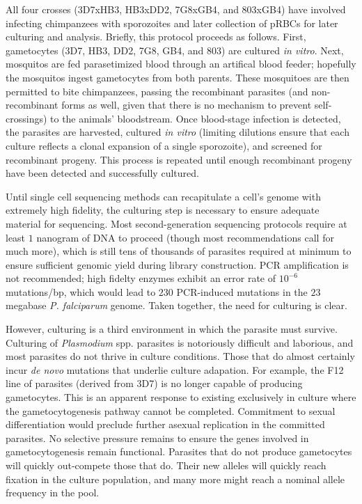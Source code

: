 All four crosses (3D7xHB3, HB3xDD2, 7G8xGB4, and 803xGB4) have involved infecting chimpanzees with sporozoites and later collection of pRBCs for later culturing and analysis\cite{RanfordCartwright:2012kp}.  Briefly, this protocol proceeds as follows.  First, gametocytes (3D7, HB3, DD2, 7G8, GB4, and 803) are cultured \textit{in vitro}.  Next, mosquitos are fed parasetimized blood through an artifical blood feeder\cite{Su:2007ipa}; hopefully the mosquitos ingest gametocytes from both parents.  These mosquitoes are then permitted to bite chimpanzees, passing the recombinant parasites (and non-recombinant forms as well, given that there is no mechanism to prevent self-crossings) to the animals' bloodstream.  Once blood-stage infection is detected, the parasites are harvested, cultured \textit{in vitro} (limiting dilutions ensure that each culture reflects a clonal expansion of a single sporozoite), and screened for recombinant progeny.  This process is repeated until enough recombinant progeny have been detected and successfully cultured.

Until single cell sequencing methods can recapitulate a cell's genome with extremely high fidelity, the culturing step is necessary to ensure adequate material for sequencing.  Most second-generation sequencing protocols require at least $1$ nanogram of DNA to proceed (though most recommendations call for much more), which is still tens of thousands of parasites required at minimum to ensure sufficient genomic yield during library construction.  PCR amplification is not recommended; high fidelty enzymes exhibit an error rate of $10^{-6}$ mutations/bp, which would lead to $230$ PCR-induced mutations in the $23$ megabase \textit{P. falciparum} genome.  Taken together, the need for culturing is clear.

However, culturing is a third environment in which the parasite must survive.  Culturing of \textit{Plasmodium} spp. parasites is notoriously difficult and laborious\cite{Schuster:2002ck}, and most parasites do not thrive in culture conditions.  Those that do almost certainly incur \textit{de novo} mutations that underlie culture adapation.  For example, the F12 line of parasites (derived from 3D7) is no longer capable of producing gametocytes\cite{Alano:1995gv,Gissot:2004dv,Silvestrini:2005gc}.  This is an apparent response to existing exclusively in culture where the gametocytogenesis pathway cannot be completed.  Commitment to sexual differentiation would preclude further asexual replication in the committed parasites.  No selective pressure remains to ensure the genes involved in gametocytogenesis remain functional.  Parasites that do not produce gametocytes will quickly out-compete those that do.  Their new alleles will quickly reach fixation in the culture population, and many more might reach a nominal allele frequency in the pool.

